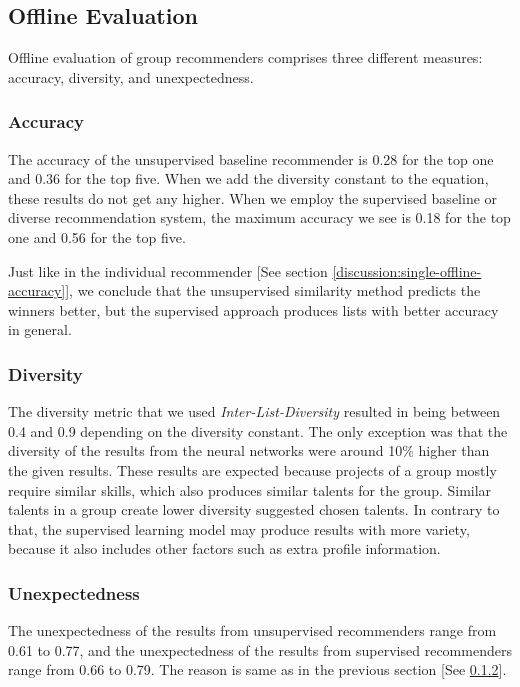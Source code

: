 \subsection{Offline Evaluation}

Offline evaluation of group recommenders comprises three different measures: accuracy, diversity, and unexpectedness.

\subsubsection{Accuracy}

The accuracy of the unsupervised baseline recommender is 0.28 for the top one and 0.36 for the top five. When we add the diversity constant to the equation, these results do not get any higher. When we employ the supervised baseline or diverse recommendation system, the maximum accuracy we see is 0.18 for the top one and 0.56 for the top five.

Just like in the individual recommender [See section \ref{discussion:single-offline-accuracy}], we conclude that the unsupervised similarity method predicts the winners better, but the supervised approach produces lists with better accuracy in general.

\subsubsection{Diversity}\label{discussion:group-offline-diversity}

The diversity metric that we used \textit{Inter-List-Diversity} resulted in being between 0.4 and 0.9 depending on the diversity constant. The only exception was that the diversity of the results from the neural networks were around 10\% higher than the given results. These results are expected because projects of a group mostly require similar skills, which also produces similar talents for the group. Similar talents in a group create lower diversity suggested chosen talents. In contrary to that, the supervised learning model may produce results with more variety, because it also includes other factors such as extra profile information.

\subsubsection{Unexpectedness}

The unexpectedness of the results from unsupervised recommenders range from 0.61 to 0.77, and the unexpectedness of the results from supervised recommenders range from 0.66 to 0.79. The reason is same as in the previous section [See \ref{discussion:group-offline-diversity}].

